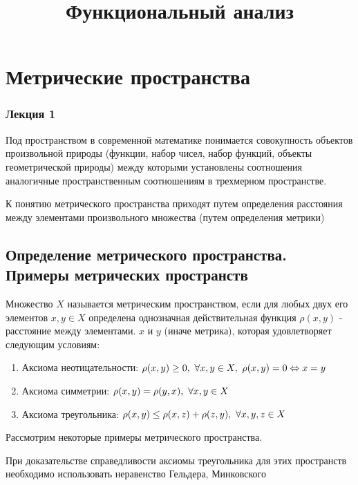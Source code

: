 \documentclass[12pt]{report}
\title{\textbf{Функциональный анализ}}
\date{}
\newcommand{\be}{\begin{enumerate}}
\newcommand{\ee}{\end{enumerate}}
\renewcommand{\[}{$\\\displaystyle}
\renewcommand{\]}{\\$}
\renewcommand{\[}{$\\\displaystyle}
\newcommand{\sep}{,\ }
\begin{document}
\sloppy

\maketitle

\tableofcontents

\chapter{Метрические пространства}

\subsection{Лекция 1}

Под пространством в современной математике понимается совокупность объектов
произвольной природы (функции, набор чисел, набор функций, объекты
геометрической природы) между которыми установлены соотношения аналогичные пространственным соотношениям в трехмерном пространстве.

К понятию метрического пространства приходят путем определения расстояния между элементами произвольного множества (путем определения метрики)

\section{Определение метрического пространства. Примеры метрических пространств}

Множество $X$ называется метрическим пространством, если для любых двух его
элементов $x, y \in X$ определена однозначная действительная функция
$\rho(x, y)$ - расстояние между элементами. $x$ и $y$ (иначе метрика), которая
удовлетворяет следующим условиям:

\be
  \item Аксиома неотицательности:
  \[  \rho(x, y) \geq 0 \sep\forall x, y \in X\sep
  \rho(x, y) = 0 \Leftrightarrow x = y \]

  \item Аксиома симметрии:
  \[  \rho(x, y) = \rho(y, x)\sep \forall x, y \in X \]

  \item Аксиома треугольника:
  \[  \rho(x, y) \leq \rho(x, z) + \rho(z, y)\sep \forall x, y, z \in X \]
\ee

Рассмотрим некоторые примеры метрического пространства.

При доказательстве справедливости аксиомы треугольника для этих пространств необходимо использовать неравенство Гельдера, Минковского
\end{document}

